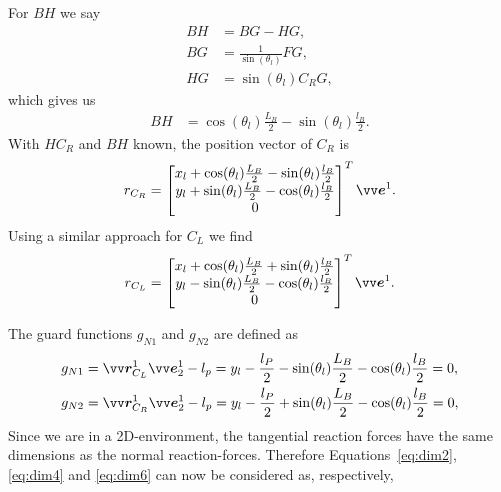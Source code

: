 \documentclass[DC2017114Bouma.tex]{subfiles}
\begin{document}
For $BH$ we say
\begin{align}
BH &= BG - HG,\\
BG &= \frac{1}{\sin(\theta_l)}FG,\\
HG &= \sin(\theta_l)C_RG,
\end{align}
which gives us 
\begin{align}
BH &= \cos(\theta_l)\frac{L_B}{2} - \sin(\theta_l)\frac{l_B}{2}.
\end{align}
With $HC_R$ and $BH$ known, the position vector of $C_R$ is
\begin{align}
r_{C_R} = \begin{bmatrix}
x_l + \cos(\theta_l)\frac{L_B}{2} - \sin(\theta_l)\frac{l_B}{2}\\
y_l + \sin(\theta_l)\frac{L_B}{2} - \cos(\theta_l)\frac{l_B}{2}\\
0
\end{bmatrix}^T\evec^1.\label{eq:rCR}
\end{align}
Using a similar approach for $C_L$ we find
\begin{align}
r_{C_L} = \begin{bmatrix}
x_l + \cos(\theta_l)\frac{L_B}{2} + \sin(\theta_l)\frac{l_B}{2}\\
y_l - \sin(\theta_l)\frac{L_B}{2} - \cos(\theta_l)\frac{l_B}{2}\\
0
\end{bmatrix}^T\evec^1. \label{eq:rCL}
\end{align}

The guard functions $g_{N1}$ and $g_{N2}$ are defined as
\begin{align}
g_{N1} &= \rvec_{C_L}^1\evec_2^1 - l_p = y_l - \frac{l_P}{2} - \sin(\theta_l)\frac{L_B}{2} - \cos(\theta_l)\frac{l_B}{2} = 0,\\
g_{N2} &= \rvec_{C_R}^1\evec_2^1 - l_p = y_l - \frac{l_P}{2} + \sin(\theta_l)\frac{L_B}{2} - \cos(\theta_l)\frac{l_B}{2} = 0,
\end{align}
Since we are in a 2D-environment, the tangential reaction forces have the same dimensions as the normal reaction-forces. Therefore Equations~\eqref{eq:dim2}, \eqref{eq:dim4} and \eqref{eq:dim6} can now be considered as, respectively,
\end{document}

